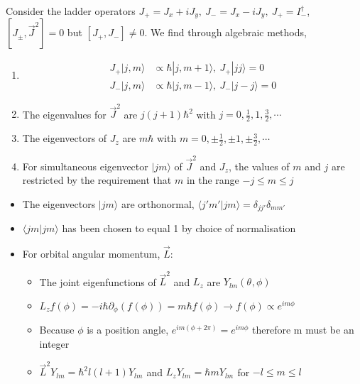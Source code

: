 \documentclass[a4paper,11pt,normalem]{article}
\begin{document}
Consider the ladder operators
\(J_{+} = J_x + iJ_y,~ J_{-} = J_x - iJ_y,~ J_{+} = I_{-}^\dagger\),
\([J_{\pm},\vec{J_{}}^2] = 0\) but \([J_{+},J_{-}] \neq 0\). We find
through algebraic methods,
\begin{enumerate}
\item
  \[\begin{aligned}
   J_{+}|j,m\rangle &\propto \hbar|j,m+1\rangle,~ J_{+}|jj\rangle = 0 \\
   J_{-}|j,m\rangle &\propto \hbar|j,m-1\rangle,~ J_{-}|j-j\rangle = 0
   \end{aligned}\]
\item
  The eigenvalues for \(\vec{J}^2\) are \(j(j+1)\hbar^2\) with
  \(j = 0,\frac{1}{2},1,\frac{3}{2},\cdots\)
\item
  The eigenvectors of \(J_z\) are \(m\hbar\) with
  \(m = 0,\pm\frac{1}{2},\pm 1,\pm\frac{3}{2},\cdots\)
\item
  For simultaneous eigenvector \(|jm\rangle\) of \(\vec{J}^2\) and
  \(J_z\), the values of \(m\) and \(j\) are restricted by the
  requirement that \(m\) in the range \(-j \leq m \leq j\)
\end{enumerate}

\begin{itemize}
\item
  The eigenvectors \(|jm\rangle\) are orthonormal,
  \(\langle j'm'|jm\rangle = \delta_{jj'}\delta_{mm'}\)
\item
  \(\langle jm|jm\rangle\) has been chosen to equal 1 by choice of
  normalisation
\item
  For orbital angular momentum, \(\vec{L}\):
  \begin{itemize}
  \item
    The joint eigenfunctions of \(\vec{L}^2\) and \(L_z\) are
    \(Y_{lm}(\theta_{},\phi)\)
  \item
    \(L_zf(\phi) = -i\hbar\partial_{\phi}(f_{}(\phi)) = m\hbar f(\phi) \to f(\phi) \propto e^{im\phi}\)
  \item
    Because \(\phi\) is a position angle,
    \(e^{im(\phi + 2\pi)} = e^{im\phi}\) therefore m must be an integer
  \item
    \(\vec{L}^2Y_{lm} = \hbar^2_{}l(l+1)Y_{lm_{}}\) and
    \(L_zY_{lm_{}} = \hbar mY_{lm_{}}\) for \(-l \leq m \leq l\)
  \end{itemize}
\end{itemize}

\section{}\label{lecture-17}
\end{document}
